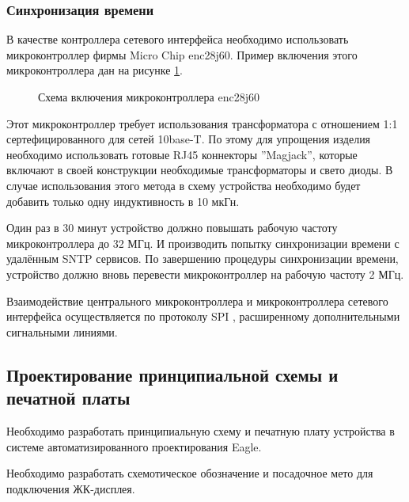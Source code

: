\subsubsection{Синхронизация времени}
\begin{par}
В качестве контроллера сетевого интерфейса необходимо использовать микроконтроллер фирмы Micro Chip
enc28j60. Пример включения этого микроконтроллера дан на рисунке \ref{img:ienc28j60}.
\begin{figure}[h]
	\caption{Схема включения микроконтроллера enc28j60}
	\label{img:ienc28j60}
\end{figure}

Этот микроконтроллер требует использования трансформатора с отношением 1:1 сертефицированного
для сетей 10base-T. По этому для упрощения изделия необходимо использовать готовые RJ45
коннекторы ''Magjack'', которые включают в своей конструкции необходимые трансформаторы и
свето диоды. В случае использования этого метода в схему устройства необходимо будет добавить
только одну индуктивность в 10 мкГн.
\end{par}

\begin{par}
Один раз в 30 минут устройство должно повышать рабочую частоту микроконтроллера до 32 МГц.
И производить попытку синхронизации времени с удалённым SNTP сервисов. По завершению процедуры
синхронизации времени, устройство должно вновь перевести микроконтроллер на рабочую частоту 2 МГц.
\end{par}

\begin{par}
Взаимодействие центрального микроконтроллера и микроконтроллера сетевого интерфейса осуществляется
по протоколу SPI \cite{enc28j60}, расширенному дополнительными сигнальными линиями.
\end{par}


\subsection{Проектирование принципиальной схемы и печатной платы}
\begin{par}
Необходимо разработать принципиальную схему и печатную плату устройства в системе автоматизированного
проектирования Eagle.
\end{par}

\begin{par}
Необходимо разработать схемотическое обозначение и посадочное мето для подключения ЖК-дисплея.
\end{par}


